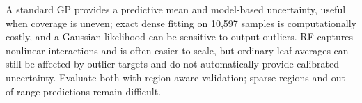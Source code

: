 A standard GP provides a predictive mean and model-based uncertainty, useful when coverage is uneven; exact dense fitting on 10,597 samples is computationally costly, and a Gaussian likelihood can be sensitive to output outliers. RF captures nonlinear interactions and is often easier to scale, but ordinary leaf averages can still be affected by outlier targets and do not automatically provide calibrated uncertainty. Evaluate both with region-aware validation; sparse regions and out-of-range predictions remain difficult.
